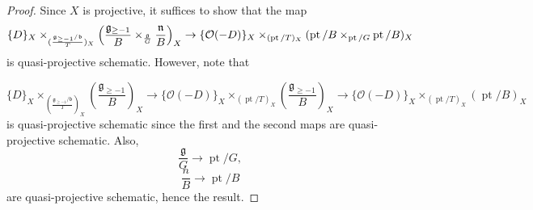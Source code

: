 \documentclass[9pt]{amsart}
\DeclareMathOperator{\pt}{{pt}}
\DeclareMathOperator{\reg}{{reg}}
\newcommand{\bG}{{\mathbb G}}
\newcommand{\cO}{{\mathcal O}}
\newcommand{\cZ}{{\mathcal Z}}
\DeclareMathOperator{\Maps}{{Maps}}
\DeclareMathOperator{\Nilp}{{Nilp}} \DeclareMathOperator{\op}{{op}}
\numberwithin{equation}{section}
\begin{document}
\begin{proof}
		Since $X$ is projective, it suffices to show that the map $$\{D\}_X \times_{(\frac{\mathfrak{g}_{\geq -1}/\mathfrak{b}}{T})_X}\Bigl(\frac{\mathfrak{g}_{\geq -1}}{B} \times_{\frac{\mathfrak{g}}{G }} \frac{\mathfrak{n}}{B}\Bigr)_X \rightarrow \{ \cO(-D)\}_X\times_{(\pt/T)_X} (\pt/B \times_{\pt/G} \pt/B)_X $$ is quasi-projective schematic. However, note that 
		
		$$\{D\}_X \times_{(\frac{\mathfrak{g}_{\geq -1}/\mathfrak{b}}{T})_X}(\frac{\mathfrak{g}_{\geq -1}}{B})_X \rightarrow \{\cO(-D)\}_X\times_{(\pt/T)_X} (\frac{\mathfrak{g}_{\geq -1}}{B})_X \rightarrow  \{\cO(-D)\}_X\times_{(\pt/T)_X} (\pt/B)_X$$
		is quasi-projective schematic since the first and the second maps are quasi-projective schematic. Also, 
		$$\frac{\mathfrak{g}}{G } \rightarrow \pt/G,$$
		$$\frac{n}{B} \rightarrow \pt/B$$
		are quasi-projective schematic, hence the result.
		
	
	
		
		
		
\end{proof}
\end{document}
